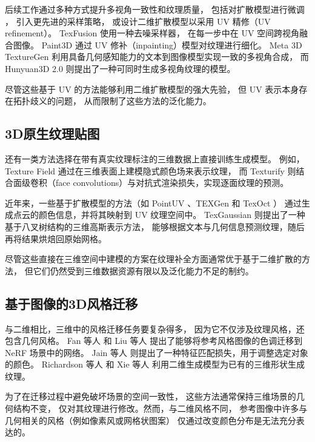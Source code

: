 后续工作通过多种方式提升多视角一致性和纹理质量，
包括对扩散模型进行微调\cite{zhao2025hunyuan3d} \cite{zeng2024paint3d}，
引入更先进的采样策略\cite{zhang2024texpainter}，
或设计二维扩散模型以采用 UV 精修（UV refinement）\cite{yu2024texgen}。
TexFusion \cite{Cao_2023_ICCV} 使用一种去噪采样器，
在每一步中在 UV 空间跨视角融合图像。
Paint3D \cite{zeng2024paint3d} 通过 UV 修补（inpainting）模型对纹理进行细化。
Meta 3D TextureGen \cite{bensadoun2024meta} 利用具备几何感知能力的文本到图像模型实现一致的多视角合成，
而 Hunyuan3D 2.0 \cite{zhao2025hunyuan3d} 则提出了一种可同时生成多视角纹理的模型。

尽管这些基于 UV 的方法能够利用二维扩散模型的强大先验，
但 UV 表示本身存在拓扑歧义的问题，
从而限制了这些方法的泛化能力。

\subsection{3D原生纹理贴图}

还有一类方法选择在带有真实纹理标注的三维数据上直接训练生成模型。
例如，Texture Field \cite{oechsle2019texture}通过在三维表面上建模隐式颜色场来表示纹理，
而 Texturify \cite{siddiqui2022texturify} 则结合面级卷积（face convolutions）与对抗式渲染损失，实现逐面纹理的预测。

近年来，一些基于扩散模型的方法（如 PointUV \cite{yu2023texture}、TEXGen \cite{yu2024texgen} 和 TexOct \cite{liu2024texoct}）
通过生成点云的颜色信息，并将其映射到 UV 纹理空间中。
TexGaussian \cite{xiong2025texgaussian} 则提出了一种基于八叉树结构的三维高斯表示方法，
能够根据文本与几何信息预测纹理，随后再将结果烘焙回原始网格。

尽管这些直接在三维空间中建模的方案在纹理补全方面通常优于基于二维扩散的方法，
但它们仍然受到三维数据资源有限以及泛化能力不足的制约。

\subsection{基于图像的3D风格迁移}
与二维相比，三维中的风格迁移任务要复杂得多，
因为它不仅涉及纹理风格，还包含几何风格。
Fan 等人 \cite{fan2022unified} 和 Liu 等人 \cite{liu2023stylerf} 提出了能够将参考风格图像的色调迁移到 NeRF 场景中的网络。
Jain 等人 \cite{jain2024stylesplat} 则提出了一种特征匹配损失，用于调整选定对象的颜色。
Richardson 等人 \cite{richardson2023texture} 和 Xie 等人 \cite{xie2024styletex} 利用二维生成模型为已有的三维形状生成纹理。

为了在迁移过程中避免破坏场景的空间一致性，
这些方法通常保持三维场景的几何结构不变，
仅对其纹理进行修改。然而，与二维风格不同，
参考图像中许多与几何相关的风格（例如像素风或网格状图案）
仅通过改变颜色分布是无法充分表达的。


